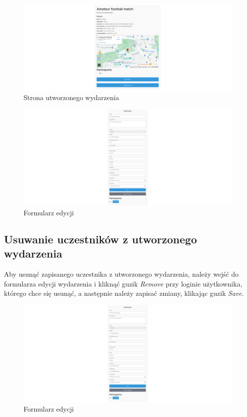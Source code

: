 \documentclass[11pt,a4paper]{article}
\begin{document}
\begin{figure} [H]
    \centering
    \includegraphics[width=1\linewidth]{pages/my_event.png}
    \caption{Strona utworzonego wydarzenia}
\end{figure}

\begin{figure} [H]
    \centering
    \includegraphics[width=1\linewidth]{pages/edit_event.png}
    \caption{Formularz edycji}
\end{figure}

\subsection{Usuwanie uczestników z utworzonego wydarzenia}

Aby usunąć zapisanego uczestnika z utworzonego wydarzenia, należy wejść do formularza edycji wydarzenia i kliknąć guzik \textit{Remove} przy loginie użytkownika, którego chce się usunąć, a następnie należy zapisać zmiany, klikając guzik \textit{Save}.

\begin{figure} [H]
    \centering
    \includegraphics[width=1\linewidth]{pages/edit_event.png}
    \caption{Formularz edycji}
\end{figure}
\end{document}
